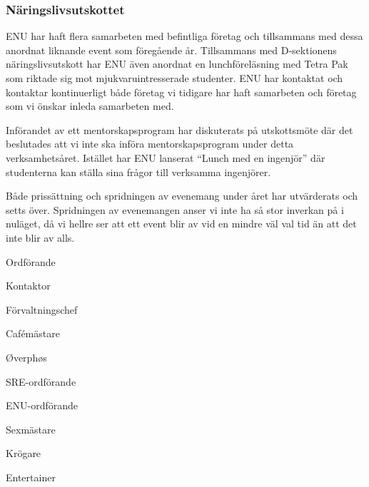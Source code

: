 \documentclass[../_main/handlingar.tex]{subfiles}
\begin{document}
\subsubsection*{Näringslivsutskottet}
ENU har haft flera samarbeten med befintliga företag och tillsammans med dessa anordnat liknande event som föregående år. Tillsammans med D-sektionens näringslivsutskott har ENU även anordnat en lunchföreläsning med Tetra Pak som riktade sig mot mjukvaruintresserade studenter. ENU har kontaktat och kontaktar kontinuerligt både företag vi tidigare har haft samarbeten och företag som vi önskar inleda samarbeten med.

Införandet av ett mentorskapsprogram har diskuterats på utskottsmöte där det beslutades att vi inte ska införa mentorskapsprogram under detta verksamhetsåret. Istället har ENU lanserat ``Lunch med en ingenjör'' där studenterna kan ställa sina frågor till verksamma ingenjörer.

Både prissättning och spridningen av evenemang under året har utvärderats och setts över. Spridningen av evenemangen anser vi inte ha så stor inverkan på i nuläget, då vi hellre ser att ett event blir av vid en mindre väl val tid än att det inte blir av alls.

\newpage
\begin{signatures}{10}
    \mvh
    \signature{Fredrik Peterson}{Ordförande}
    \signature{Erik Månsson}{Kontaktor}
    \signature{Anders Nilsson}{Förvaltningschef}
    \signature{Stephanie Mirsky}{Cafémästare}
    \signature{Molly Rusk}{Øverphøs}
    \signature{Johan Persson}{SRE-ordförande}
    \signature{Johannes Koch}{ENU-ordförande}
    \signature{Martin Gemborn Nilsson}{Sexmästare}
    \signature{Malin Lindström}{Krögare}
    \signature{Dalia Khairallah}{Entertainer}
\end{signatures}
\end{document}
